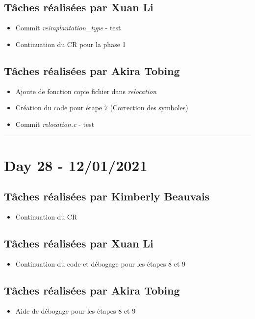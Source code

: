 \documentclass[11pt,letterpaper]{article}
\begin{document}
\subsection*{Tâches réalisées par Xuan Li}
\begin{itemize}
    \item Commit \textit{reimplantation\_type} - test
    \item Continuation du CR pour la phase 1
\end{itemize}

\subsection*{Tâches réalisées par Akira Tobing}
\begin{itemize}
    \item Ajoute de fonction copie fichier dans \textit{relocation} 
    \item Création du code pour étape 7 (Correction des symboles)
    \item Commit \textit{relocation.c} - test
\end{itemize}

\noindent\rule{13cm}{0.4pt}

\section*{Day 28 - 12/01/2021}

\subsection*{Tâches réalisées par Kimberly Beauvais}
\begin{itemize}
    \item Continuation du CR
\end{itemize}

\subsection*{Tâches réalisées par Xuan Li}
\begin{itemize}
    \item Continuation du code et débogage pour les étapes 8 et 9
\end{itemize}

\subsection*{Tâches réalisées par Akira Tobing}
\begin{itemize}
    \item Aide de débogage pour les étapes 8 et 9
\end{itemize}
\end{document}
